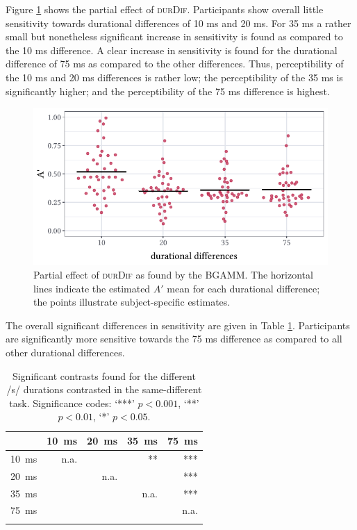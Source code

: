 Figure \ref{fig:6_4} shows the partial effect of \textsc{durDif}. Participants show overall little sensitivity towards durational differences of 10 ms and 20 ms. For 35 ms a rather small but nonetheless significant increase in sensitivity is found as compared to the 10 ms difference. A clear increase in sensitivity is found for the durational difference of 75 ms as compared to the other differences. Thus, perceptibility of the 10 ms and 20 ms differences is rather low; the perceptibility of the 35 ms is significantly higher; and the perceptibility of the 75 ms difference is highest.

\begin{figure}
    \centering
    \includegraphics[]{figures/fig6.4.pdf}
    \caption{Partial effect of \textsc{durDif} as found by the BGAMM. The horizontal lines indicate the estimated $A'$ mean for each durational difference; the points illustrate subject-specific estimates.}
    \label{fig:6_4}
\end{figure}

The overall significant differences in sensitivity are given in Table \ref{tab:6.12}. Participants are significantly more sensitive towards the 75 ms difference as compared to all other durational differences. 

\begin{table}\fontsize{10}{11}
\caption{Significant contrasts found for the different /s/ durations contrasted in the same-different task. Significance codes: `***' $p < 0.001$, `**' $p < 0.01$, `*' $p < 0.05$.}
\label{tab:6.12}
\centering
\begin{tabular}{lrrrr} 
\lsptoprule
\textbf{~} & 10~ms & 20~ms & 35~ms & 75~ms  \\ 
\midrule
10~ms      & n.a.  & ~     & **    & ***    \\
20~ms      & ~     & n.a.  & ~     & ***    \\
35~ms      & ~     & ~     & n.a.  & ***    \\
75~ms      & ~     & ~     & ~     & n.a.   \\
\lspbottomrule
\end{tabular}
\end{table}


